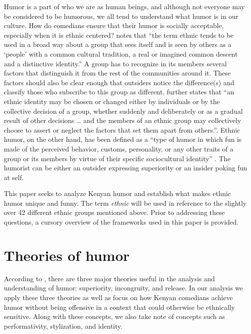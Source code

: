 \documentclass[output=paper]{langsci/langscibook}
\begin{document}
   Humor is a part of who we are as human beings, and although not everyone may be considered to be humorous, we all tend to understand what humor is in our culture. How do comedians ensure that their humor is socially acceptable, especially when it is ethnic centered? \citet[1]{Davies1990} notes that “the term ethnic tends to be used in a broad way about a group that sees itself and is seen by others as a ‘people’ with a common cultural tradition, a real or imagined common descent and a distinctive identity.” A group has to recognize in its members several factors that distinguish it from the rest of the communities around it. These factors should also be clear enough that outsiders notice the difference(s) and classify those who subscribe to this group as different. \citet[1]{Davies1990} further states that “an ethnic identity may be chosen or changed either by individuals or by the collective decision of a group, whether suddenly and deliberately or as a gradual result of other decisions … and the members of an ethnic group may collectively choose to assert or neglect the factors that set them apart from others.”. Ethnic humor, on the other hand, has been defined as a “type of humor in which fun is made of the perceived behavior, customs, personality, or any other traits of a group or its members by virtue of their specific sociocultural identity” \citep[108]{Apte1985}. The humorist can be either an outsider expressing superiority or an insider poking fun at self. 

 This paper seeks to analyze Kenyan humor and establish what makes ethnic humor unique and funny. The term \textit{ethnic} will be used in reference to the slightly over 42 different ethnic groups mentioned above. Prior to addressing these questions, a cursory overview of the frameworks used in this paper is provided. \\

\section{Theories of humor}

   According to \citet{Raskin1985}, there are three major theories useful in the analysis and understanding of humor: superiority, incongruity, and release. In our analysis we apply these three theories as well as focus on how Kenyan comedians achieve humor without being offensive in a context that could otherwise be ethnically sensitive. Along with these concepts, we also take note of concepts such as performativity, stylization, and identity. 
\end{document}
